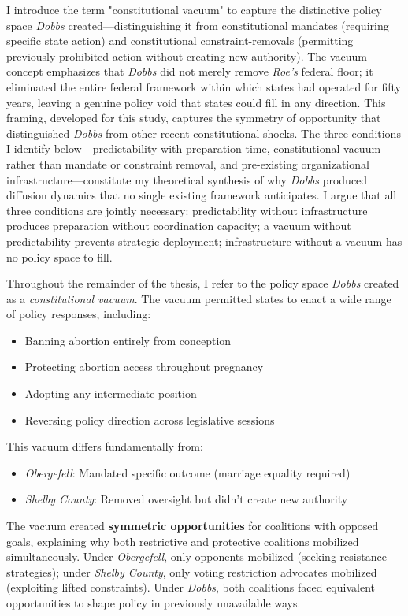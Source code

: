 I introduce the term "constitutional vacuum" to capture the distinctive policy space \emph{Dobbs} created---distinguishing it from constitutional mandates (requiring specific state action) and constitutional constraint-removals (permitting previously prohibited action without creating new authority). The vacuum concept emphasizes that \emph{Dobbs} did not merely remove \emph{Roe's} federal floor; it eliminated the entire federal framework within which states had operated for fifty years, leaving a genuine policy void that states could fill in any direction. This framing, developed for this study, captures the symmetry of opportunity that distinguished \textit{Dobbs} from other recent constitutional shocks. The three conditions I identify below---predictability with preparation time, constitutional vacuum rather than mandate or constraint removal, and pre-existing organizational infrastructure---constitute my theoretical synthesis of why \textit{Dobbs} produced diffusion dynamics that no single existing framework anticipates. I argue that all three conditions are jointly necessary: predictability without infrastructure produces preparation without coordination capacity; a vacuum without predictability prevents strategic deployment; infrastructure without a vacuum has no policy space to fill.

Throughout the remainder of the thesis, I refer to the policy space \textit{Dobbs} created as a \emph{constitutional vacuum}. The vacuum permitted states to enact a wide range of policy responses, including:

\begin{itemize}
\item Banning abortion entirely from conception
\item Protecting abortion access throughout pregnancy
\item Adopting any intermediate position
\item Reversing policy direction across legislative sessions
\end{itemize}

This vacuum differs fundamentally from:
\begin{itemize}
\item \emph{Obergefell}: Mandated specific outcome (marriage equality required)
\item \emph{Shelby County}: Removed oversight but didn't create new authority
\end{itemize}

The vacuum created \textbf{symmetric opportunities} for coalitions with opposed goals, explaining why both restrictive and protective coalitions mobilized simultaneously. Under \emph{Obergefell}, only opponents mobilized (seeking resistance strategies); under \emph{Shelby County}, only voting restriction advocates mobilized (exploiting lifted constraints). Under \emph{Dobbs}, both coalitions faced equivalent opportunities to shape policy in previously unavailable ways.

